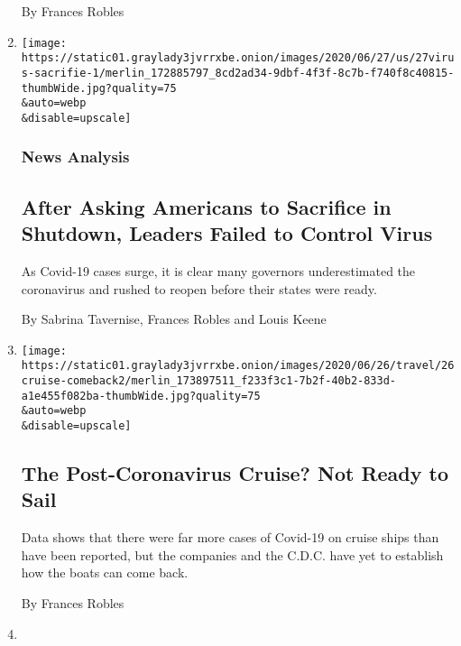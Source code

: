 \begin{enumerate}
  By Frances Robles
\item
  \href{/2020/06/27/us/after-asking-americans-to-sacrifice-in-shutdown-leaders-failed-to-control-virus.html}{}

  \texttt{[image: https://static01.graylady3jvrrxbe.onion/images/2020/06/27/us/27virus-sacrifie-1/merlin\_172885797\_8cd2ad34-9dbf-4f3f-8c7b-f740f8c40815-thumbWide.jpg?quality=75\\\&auto=webp\\\&disable=upscale]}

  \hypertarget{news-analysis}{%
  \subsubsection{News Analysis}\label{news-analysis}}

  \hypertarget{after-asking-americans-to-sacrifice-in-shutdown-leaders-failed-to-control-virus}{%
  \subsection{After Asking Americans to Sacrifice in Shutdown, Leaders
  Failed to Control
  Virus}\label{after-asking-americans-to-sacrifice-in-shutdown-leaders-failed-to-control-virus}}

  As Covid-19 cases surge, it is clear many governors underestimated the
  coronavirus and rushed to reopen before their states were ready.

  By Sabrina Tavernise, Frances Robles and Louis Keene
\item
  \href{/2020/06/26/travel/coronavirus-cruises-reopening.html}{}

  \texttt{[image: https://static01.graylady3jvrrxbe.onion/images/2020/06/26/travel/26cruise-comeback2/merlin\_173897511\_f233f3c1-7b2f-40b2-833d-a1e455f082ba-thumbWide.jpg?quality=75\\\&auto=webp\\\&disable=upscale]}

  \hypertarget{the-post-coronavirus-cruise-not-ready-to-sail}{%
  \subsection{The Post-Coronavirus Cruise? Not Ready to
  Sail}\label{the-post-coronavirus-cruise-not-ready-to-sail}}

  Data shows that there were far more cases of Covid-19 on cruise ships
  than have been reported, but the companies and the C.D.C. have yet to
  establish how the boats can come back.

  By Frances Robles
\item
  \href{/es/2020/06/17/espanol/america-latina/presidente-honduras-coronavirus.html}{}


\end{enumerate}
